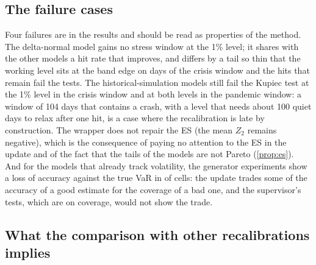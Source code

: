 \subsection{The failure cases}
\label{sec:discussion-failures}

Four failures are in the results and should be read as properties of the method. The delta-normal model gains no stress window at the 1\% level; it shares with the other models a hit rate that improves, and differs by a tail so thin that the working level sits at the band edge on \clipDnRollingOneEqCrisis{} days of the crisis window and the hits that remain fail the tests. The historical-simulation models still fail the Kupiec test at the 1\% level in the crisis window and at both levels in the pandemic window: a window of 104 days that contains a crash, with a level that needs about 100 quiet days to relax after one hit, is a case where the recalibration is late by construction. The wrapper does not repair the ES (the mean $Z_2$ remains negative), which is the consequence of paying no attention to the ES in the update and of the fact that the tails of the models are not Pareto (\cref{prop:es}). And for the models that already track volatility, the generator experiments show a loss of accuracy against the true VaR in \genErrWorseCells{} of \genErrWorseDen{} cells: the update trades some of the accuracy of a good estimate for the coverage of a bad one, and the supervisor's tests, which are on coverage, would not show the trade.

\subsection{What the comparison with other recalibrations implies}
\label{sec:discussion-comparison}

